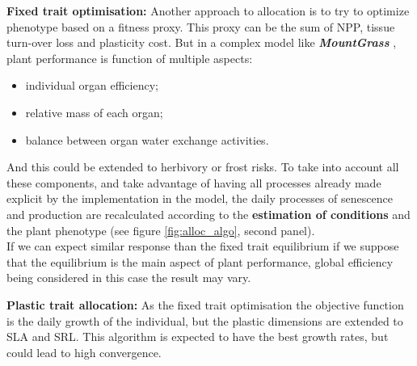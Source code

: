 \documentclass[a4paper,twoside, justified,marginals=raggedright, nobib]{tufte-handout}
\newcommand{\model}{\textit{\textbf{MountGrass }}}
\begin{document}
\textbf{Fixed trait optimisation:} Another approach to allocation is to try to optimize phenotype based on a fitness proxy. This proxy can  be the sum of NPP, tissue turn-over loss and plasticity cost. But in a complex model like \model, plant performance is function of multiple aspects:\\
\begin{itemize}
\item individual organ efficiency;
\item relative mass of each organ;
\item balance between organ water exchange activities.
\end{itemize}
And this could be extended to herbivory or frost risks. To take into account all these components, and take advantage of having all processes already made explicit by the implementation in the model, the daily processes of senescence and production are recalculated according to the \textbf{estimation of conditions} and the plant phenotype (see figure \ref{fig:alloc_algo}, second panel).\\
\indent If we can expect similar response than the fixed trait equilibrium if we suppose that the equilibrium is the main aspect of plant performance, global efficiency being considered in this case the result may vary.


\textbf{Plastic trait allocation:} As the fixed trait optimisation the objective function is the daily growth of the individual, but the plastic dimensions are extended to SLA and SRL. This algorithm is expected to have the best growth rates, but could lead to high convergence.
\end{document}
